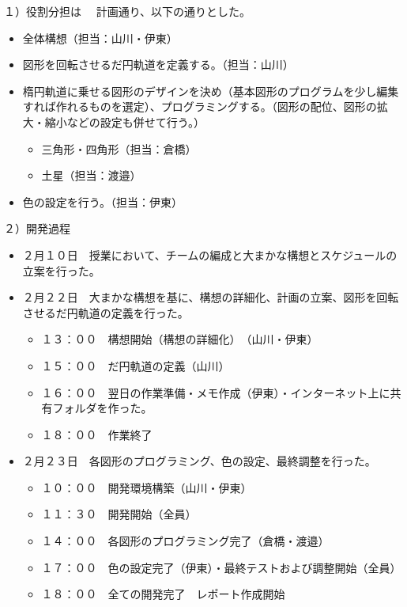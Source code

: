 \documentclass[12pt,a4j]{jarticle}
\begin{document}
１）役割分担は
　計画通り、以下の通りとした。

\begin{itemize}
  \item 全体構想（担当：山川・伊東）
  \item 図形を回転させるだ円軌道を定義する。（担当：山川）
  \item 楕円軌道に乗せる図形のデザインを決め（基本図形のプログラムを少し編集すれば作れるものを選定）、プログラミングする。（図形の配位、図形の拡大・縮小などの設定も併せて行う。）
  \begin{itemize}
    \item 三角形・四角形（担当：倉橋）
    \item 土星（担当：渡邉）
  \end{itemize}
  \item 色の設定を行う。（担当：伊東）
\end{itemize}

２）開発過程

\begin{itemize}
  \item ２月１０日　授業において、チームの編成と大まかな構想とスケジュールの立案を行った。
  \item ２月２２日　大まかな構想を基に、構想の詳細化、計画の立案、図形を回転させるだ円軌道の定義を行った。
  \begin{itemize}
    \item １３：００　構想開始（構想の詳細化）　（山川・伊東）
    \item １５：００　だ円軌道の定義（山川）
    \item １６：００　翌日の作業準備・メモ作成（伊東）・インターネット上に共有フォルダを作った。
    \item １８：００　作業終了
  \end{itemize}
  \item ２月２３日　各図形のプログラミング、色の設定、最終調整を行った。
  \begin{itemize}
    \item １０：００　開発環境構築（山川・伊東）
　　 \item １１：３０　開発開始（全員）
　　 \item １４：００　各図形のプログラミング完了（倉橋・渡邉）
    \item １７：００　色の設定完了（伊東）・最終テストおよび調整開始（全員）
    \item １８：００　全ての開発完了　レポート作成開始
  \end{itemize}
\end{itemize}
\end{document}
